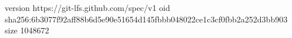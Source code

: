 version https://git-lfs.github.com/spec/v1
oid sha256:6b3077f92aff88b6d5e90e51654d145fbbb048022ce1c3cf0fbb2a252d3bb903
size 1048672
